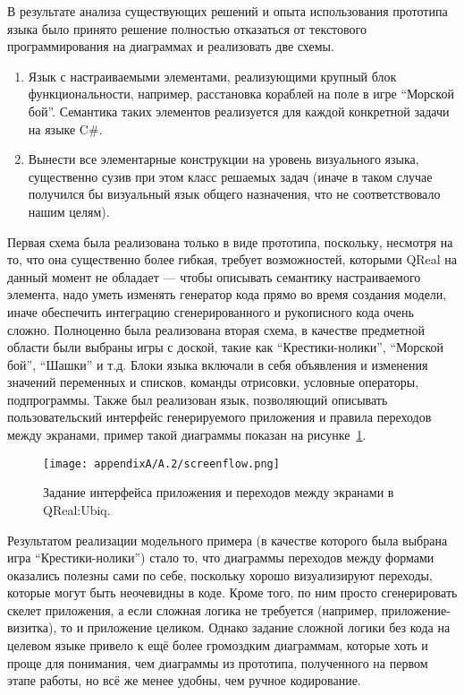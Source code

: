 В результате анализа существующих решений и опыта использования прототипа языка было 
принято решение полностью отказаться от текстового программирования на диаграммах и реализовать две схемы.
\begin{enumerate}
	\item Язык с настраиваемыми элементами, реализующими крупный блок функциональности, 
		например, расстановка кораблей на поле в игре "`Морской бой"'. Семантика таких 
		элементов реализуется для каждой конкретной задачи на языке C\#.
	\item Вынести все элементарные конструкции на уровень визуального языка, существенно 
		сузив при этом класс решаемых задач (иначе в таком случае получился бы визуальный 
		язык общего назначения, что не соответствовало нашим целям). 
\end{enumerate}

Первая схема была реализована только в виде прототипа, поскольку, несмотря на то, 
что она существенно более гибкая, требует возможностей, которыми QReal на данный момент 
не обладает --- чтобы описывать семантику настраиваемого элемента, надо уметь изменять 
генератор кода прямо во время создания модели, иначе обеспечить интеграцию сгенерированного 
и рукописного кода очень сложно. Полноценно была реализована вторая схема, в качестве 
предметной области были выбраны игры с доской, такие как "`Крестики-нолики"', "`Морской бой"', 
"`Шашки"' и т.д. Блоки языка включали в себя объявления и изменения значений переменных 
и списков, команды отрисовки, условные операторы, подпрограммы. Также был реализован 
язык, позволяющий описывать пользовательский интерфейс генерируемого приложения и правила 
переходов между экранами, пример такой диаграммы показан на рисунке~\ref{image:screenflow}.

\begin{figure} [ht]
	\begin{center}
		\texttt{[image: appendixA/A.2/screenflow.png]}
		\caption{Задание интерфейса приложения и переходов между экранами в QReal:Ubiq.}
		\label{image:screenflow}
	\end{center}
\end{figure}

Результатом реализации модельного примера (в качестве которого была выбрана игра "`Крестики-нолики"') 
стало то, что диаграммы переходов между формами оказались полезны сами по себе, поскольку 
хорошо визуализируют переходы, которые могут быть неочевидны в коде. Кроме того, по 
ним просто сгенерировать скелет приложения, а если сложная логика не требуется (например, 
приложение-визитка), то и приложение целиком. Однако задание сложной логики без кода 
на целевом языке привело к ещё более громоздким диаграммам, которые хоть и проще для 
понимания, чем диаграммы из прототипа, полученного на первом этапе работы, но всё 
же менее удобны, чем ручное кодирование.


